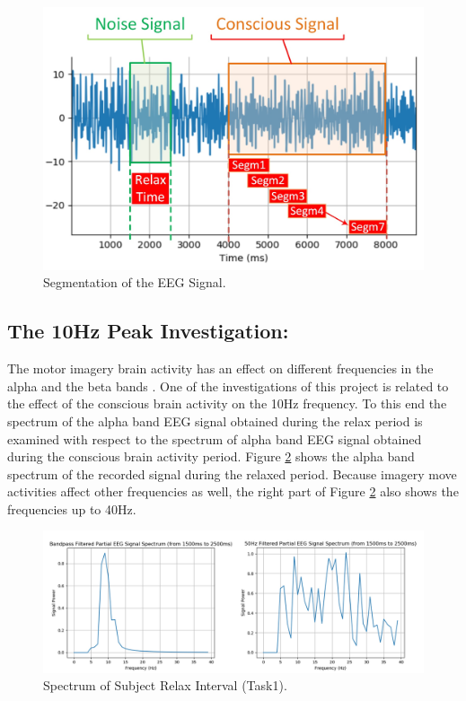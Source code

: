 \begin{figure}[hbt!]
	\centering
	\includegraphics[width=\linewidth]{Figures/segments.jpg} 
	\caption{Segmentation of the EEG Signal.} 
	\label{segments} 
\end{figure}

\subsection{\bf{The 10Hz Peak Investigation:}}
The motor imagery brain activity has an effect on different frequencies in the alpha and the beta bands \citep{Pfurtscheller2000, Khulman1978}. One of the investigations of this project is related to the effect of the conscious brain activity on the 10Hz frequency. To this end the spectrum of the alpha band EEG signal obtained during the relax period is examined with respect to the spectrum of alpha band EEG signal obtained during the conscious brain activity period. Figure \ref{relaxed} shows the alpha band spectrum of the recorded signal during the relaxed period. Because imagery move activities affect other frequencies as well, the right part of Figure \ref{relaxed} also shows the frequencies up to 40Hz. 


 \begin{figure}[hbt!]
	\centering
	\includegraphics[width=\linewidth]{Figures/relaxed.jpg} 
	\caption{Spectrum of Subject Relax Interval (Task1).} 
	\label{relaxed} 
\end{figure}


